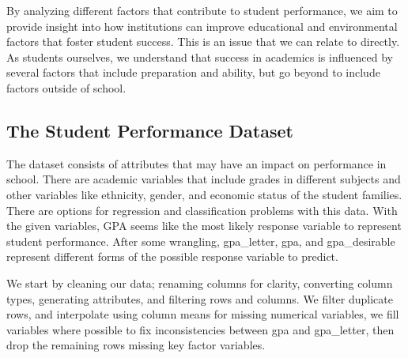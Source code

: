 \documentclass[
]{article}
\begin{document}
By analyzing different factors that contribute to student performance,
we aim to provide insight into how institutions can improve educational
and environmental factors that foster student success. This is an issue
that we can relate to directly. As students ourselves, we understand
that success in academics is influenced by several factors that include
preparation and ability, but go beyond to include factors outside of
school.

\subsection{The Student Performance
Dataset}\label{the-student-performance-dataset}

The dataset consists of attributes that may have an impact on
performance in school. There are academic variables that include grades
in different subjects and other variables like ethnicity, gender, and
economic status of the student families. There are options for
regression and classification problems with this data. With the given
variables, GPA seems like the most likely response variable to represent
student performance. After some wrangling, gpa\_letter, gpa, and
gpa\_desirable represent different forms of the possible response
variable to predict.

We start by cleaning our data; renaming columns for clarity, converting
column types, generating attributes, and filtering rows and columns. We
filter duplicate rows, and interpolate using column means for missing
numerical variables, we fill variables where possible to fix
inconsistencies between gpa and gpa\_letter, then drop the remaining
rows missing key factor variables.
\end{document}
